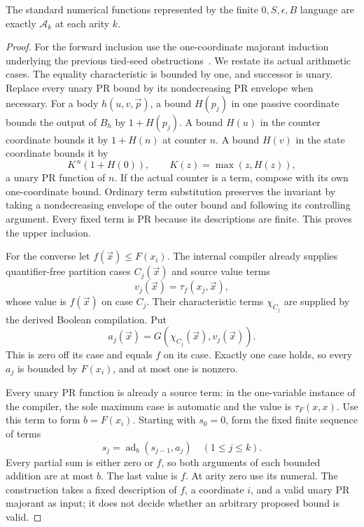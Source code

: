 \begin{theorem}
\label{thm:exact-standard}
The standard numerical functions represented by the finite $0,S,\epsilon,B$ language are exactly $\mathcal A_k$ at each arity $k$.
\end{theorem}
\begin{proof}
For the forward inclusion use the one-coordinate majorant induction underlying the previous tied-seed obstructions~\cite{local,uniform}. We restate its actual arithmetic cases. The equality characteristic is bounded by one, and successor is unary. Replace every unary PR bound by its nondecreasing PR envelope when necessary. For a body $h(u,v,\vec p)$, a bound $H(p_j)$ in one passive coordinate bounds the output of $B_h$ by $1+H(p_j)$. A bound $H(u)$ in the counter coordinate bounds it by $1+H(n)$ at counter $n$. A bound $H(v)$ in the state coordinate bounds it by
\[
 K^{\,n}(1+H(0)),\qquad K(z)=\max(z,H(z)),
\]
a unary PR function of $n$. If the actual counter is a term, compose with its own one-coordinate bound. Ordinary term substitution preserves the invariant by taking a nondecreasing envelope of the outer bound and following its controlling argument. Every fixed term is PR because its descriptions are finite. This proves the upper inclusion.

For the converse let $f(\vec x)\leq F(x_i)$. The internal compiler already supplies quantifier-free partition cases $C_j(\vec x)$ and source value terms
\[
                    v_j(\vec x)=\tau_f(x_j,\vec x),
\]
whose value is $f(\vec x)$ on case $C_j$. Their characteristic terms $\chi_{C_j}$ are supplied by the derived Boolean compilation. Put
\[
                      a_j(\vec x)=G(\chi_{C_j}(\vec x),v_j(\vec x)).
\]
This is zero off its case and equals $f$ on its case. Exactly one case holds, so every $a_j$ is bounded by $F(x_i)$, and at most one is nonzero.

Every unary PR function is already a source term: in the one-variable instance of the compiler, the sole maximum case is automatic and the value is $\tau_F(x,x)$. Use this term to form $b=F(x_i)$. Starting with $s_0=0$, form the fixed finite sequence of terms
\[
                     s_j=\operatorname{ad}_{b}(s_{j-1},a_j)
                       \quad(1\leq j\leq k).
\]
Every partial sum is either zero or $f$, so both arguments of each bounded addition are at most $b$. The last value is $f$. At arity zero use its numeral. The construction takes a fixed description of $f$, a coordinate $i$, and a valid unary PR majorant as input; it does not decide whether an arbitrary proposed bound is valid.
\end{proof}

